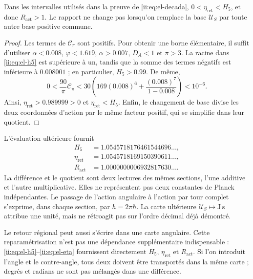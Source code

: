 \begin{proposition}
Dans les intervalles utilisés dans la preuve de \eqref{ii:eq:el-decada},
\(0<\eta_{\mathrm{ret}}<H_5\), et donc
\(R_{\mathrm{act}}>1\). Le rapport ne change pas lorsqu'on remplace la base
\(\mathcal U_S\) par toute autre base positive commune.
\end{proposition}
\begin{proof}
Les termes de \(\mathcal C_\pi\) sont positifs. Pour obtenir une borne
élémentaire, il suffit d'utiliser \(\alpha<0.008\), \(\varphi<1.619\),
\(\alpha>0.007\), \(D_A<1\) et \(\pi>3\). La racine dans
\eqref{ii:eq:el-h5} est supérieure à un, tandis que la somme des termes
négatifs est inférieure à \(0.008001\) ; en particulier, \(H_5>0.99\).
De même,
\[
 0<\frac{90}{\pi}\mathcal C_\pi
 <30\left(169(0.008)^6+
           \frac{(0.008)^7}{1-0.008}\right)<10^{-6}.
\]
Ainsi, \(\eta_{\mathrm{ret}}>0.989999>0\) et
\(\eta_{\mathrm{ret}}<H_5\). Enfin, le changement de base divise
les deux coordonnées d'action par le même facteur positif, qui se simplifie dans
leur quotient.
\end{proof}

L'évaluation ultérieure fournit
\begin{align*}
 H_5&=1.0545718176461544696\ldots,\\
 \eta_{\mathrm{ret}}&=1.0545718169150390611\ldots,\\
 R_{\mathrm{act}}&=1.0000000006932817630\ldots.
\end{align*}
La différence et le quotient sont deux lectures des mêmes sections,
l'une additive et l'autre multiplicative. Elles ne représentent pas deux constantes de
Planck indépendantes. Le passage de l'action angulaire à l'action par tour
complet s'exprime, dans chaque section, par
\(h=2\pi\hbar\). La carte ultérieure
\(\mathcal U_S\mapsto\mathrm{J\,s}\) attribue une unité, mais ne
rétroagit pas sur l'ordre décimal déjà démontré.

Le retour régional peut aussi s'écrire dans une carte angulaire.
Cette reparamétrisation n'est pas une dépendance supplémentaire indispensable :
\eqref{ii:eq:el-h5}--\eqref{ii:eq:el-eta} fournissent directement
\(H_5\), \(\eta_{\mathrm{ret}}\) et \(R_{\mathrm{act}}\). Si l'on
introduit l'angle et le contre-angle, tous deux doivent être transportés dans la même
carte ; degrés et radians ne sont pas mélangés dans une différence.


